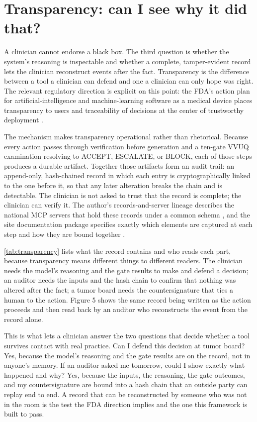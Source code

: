 \section{Transparency: can I see why it did that?}
\label{sec:transparency}

A clinician cannot endorse a black box. The third question is whether the system's
reasoning is inspectable and whether a complete, tamper-evident record lets the
clinician reconstruct events after the fact. Transparency is the difference between
a tool a clinician can defend and one a clinician can only hope was right. The
relevant regulatory direction is explicit on this point: the FDA's action plan for
artificial-intelligence and machine-learning software as a medical device places
transparency to users and traceability of decisions at the center of trustworthy
deployment \cite{fda2021samd}.

The mechanism makes transparency operational rather than rhetorical. Because every
action passes through verification before generation and a ten-gate VVUQ
examination resolving to ACCEPT, ESCALATE, or BLOCK, each of those steps produces a
durable artifact. Together those artifacts form an audit trail: an append-only,
hash-chained record in which each entry is cryptographically linked to the one
before it, so that any later alteration breaks the chain and is detectable. The
clinician is not asked to trust that the record is complete; the clinician can
verify it. The author's records-and-server lineage describes the national MCP
servers that hold these records under a common schema
\cite{Kawchak2026NationalMCPServersPhysical}, and the site documentation package
specifies exactly which elements are captured at each step and how they are bound
together \cite{Kawchak2026PhysicalAIOncologyClinical}.

\autoref{tab:transparency} lists what the record contains and who reads each part,
because transparency means different things to different readers. The clinician
needs the model's reasoning and the gate results to make and defend a decision; an
auditor needs the inputs and the hash chain to confirm that nothing was altered
after the fact; a tumor board needs the countersignature that ties a human to the
action. Figure 5 shows the same record being written as the action proceeds and
then read back by an auditor who reconstructs the event from the record alone.

This is what lets a clinician answer the two questions that decide whether a tool
survives contact with real practice. Can I defend this decision at tumor board?
Yes, because the model's reasoning and the gate results are on the record, not in
anyone's memory. If an auditor asked me tomorrow, could I show exactly what happened
and why? Yes, because the inputs, the reasoning, the gate outcomes, and my
countersignature are bound into a hash chain that an outside party can replay
end to end. A record that can be reconstructed by someone who was not in the room is
the test the FDA direction implies and the one this framework is built to pass.

